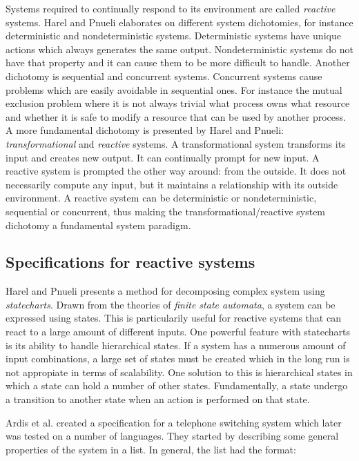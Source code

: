 Systems required to continually respond to its environment are called
\textit{reactive} systems. Harel and Pnueli \cite{harel1985development}
elaborates on different system dichotomies, for instance deterministic and
nondeterministic systems. Deterministic systems have unique actions which
always generates the same output. Nondeterministic systems do not have that
property and it can cause them to be more difficult to handle. Another
dichotomy is sequential and concurrent systems. Concurrent systems cause
problems which are easily avoidable in sequential ones. For instance the mutual
exclusion problem where it is not always trivial what process owns what
resource and whether it is safe to modify a resource that can be used by
another process. A more fundamental dichotomy is presented by Harel and Pnueli:
\textit{transformational} and \textit{reactive} systems. A transformational
system transforms its input and creates new output. It can continually prompt
for new input. A reactive system is prompted the other way around: from the
outside. It does not necessarily compute any input, but it maintains a
relationship with its outside environment. A reactive system can be
deterministic or nondeterministic, sequential or concurrent, thus making the
transformational/reactive system dichotomy a fundamental system paradigm.
\cite{harel1985development}

\subsection{Specifications for reactive systems}

Harel and Pnueli presents a method for decomposing complex system using
\textit{statecharts}. Drawn from the theories of \textit{finite state
automata}, a system can be expressed using states. This is particularily useful
for reactive systems that can react to a large amount of different inputs. One
powerful feature with statecharts is its ability to handle hierarchical states.
If a system has a numerous amount of input combinations, a large set of states
must be created which in the long run is not appropiate in terms of
scalability. One solution to this is hierarchical states in which a state can
hold a number of other states. Fundamentally, a state undergo a transition to
another state when an action is performed on that state.
\cite{harel1985development}

Ardis et al. \cite{ardis1996framework} created a specification for a telephone
switching system which later was tested on a number of languages. They started
by describing some general properties of the system in a list. In general, the
list had the format:

